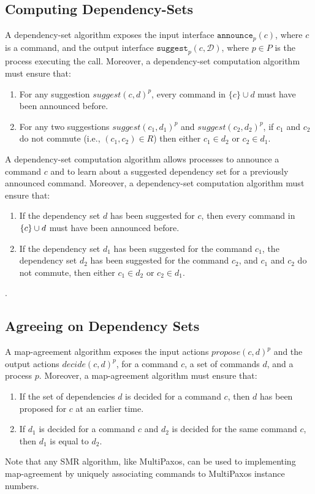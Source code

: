 \subsection{Computing Dependency-Sets}
\label{dep-algo}

A dependency-set algorithm exposes the input interface $\texttt{announce}_p\left( c \right)$, where $c$ is a command, and the output interface $\texttt{suggest}_p \left( c,\mathcal{D}\right)$, where $p\in P$ is the process executing the call.  
Moreover, a dependency-set computation algorithm must ensure that:
\begin{enumerate}
    \item For any suggestion ${suggest\left( c, d \right)}^p$, every command in $\{c\}\cup d$ must have been announced before.
    \item For any two suggestions ${suggest\left( c_1, d_1 \right)}^p$ and ${suggest\left( c_2, d_2 \right)}^p$,  if $c_1$ and $c_2$ do not commute (i.e., $\left( c_1,c_2 \right) \in R$) then either $c_1\in d_2$ or $c_2 \in d_1$.
\end{enumerate}


A dependency-set computation algorithm allows processes to announce a command $c$ and to learn about a suggested dependency set for a previously announced command.
Moreover, a dependency-set computation algorithm must ensure that:
\begin{enumerate}
    \item If the dependency set $d$ has been suggested for $c$, then every command in $\left\{c\right\}\cup d$ must have been announced before.
    \item If the dependency set $d_1$ has been suggested for the command $c_1$, the dependency set $d_2$ has been suggested for the command $c_2$, and $c_1$ and $c_2$ do not commute, then either $c_1\in d_2$ or $c_2 \in d_1$.
\end{enumerate}

.

\subsection{Agreeing on Dependency Sets}
\label{map-algo}

A map-agreement algorithm exposes the input actions ${propose\left( c, d \right)}^p$ and the output actions ${decide\left( c, d \right)}^p$, for a command $c$, a set of commands $d$, and a process $p$.
Moreover, a map-agreement algorithm must ensure that: 
\begin{enumerate}
    \item If the set of dependencies $d$ is decided for a command $c$, then $d$ has been proposed for $c$ at an earlier time.
    \item If $d_1$ is decided for a command $c$ and $d_2$ is decided for the same command $c$, then $d_1$ is equal to $d_2$.
\end{enumerate}
Note that any SMR algorithm, like MultiPaxos, can be used to implementing map-agreement by uniquely associating commands to MultiPaxos instance numbers.

